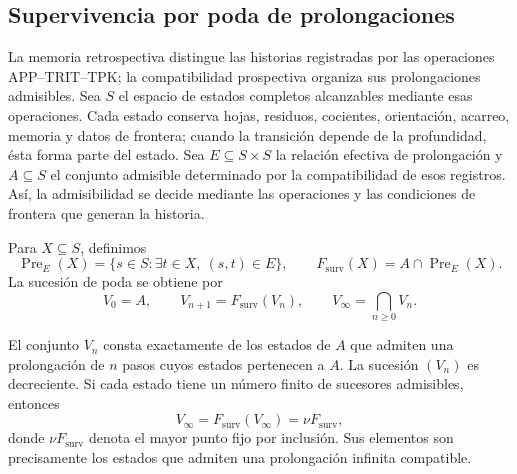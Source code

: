 \subsection{Supervivencia por poda de prolongaciones}
\label{hmtfg:base:corpus9:xi:supervivencia}

La memoria retrospectiva distingue las historias registradas por las
operaciones APP--TRIT--TPK; la compatibilidad prospectiva organiza sus
prolongaciones admisibles. Sea \(S\) el espacio de estados completos
alcanzables mediante esas operaciones. Cada estado conserva hojas, residuos,
cocientes, orientación, acarreo, memoria y datos de frontera; cuando la
transición depende de la profundidad, ésta forma parte del estado.
Sea \(E\subseteq S\times S\) la relación efectiva de prolongación y
\(A\subseteq S\) el conjunto admisible determinado por la compatibilidad de
esos registros. Así, la admisibilidad se decide mediante las operaciones y
las condiciones de frontera que generan la historia.

Para \(X\subseteq S\), definimos
\begin{equation}
 \operatorname{Pre}_{E}(X)
 =\{s\in S:\exists t\in X,\ (s,t)\in E\},
 \qquad
 F_{\mathrm{surv}}(X)=A\cap\operatorname{Pre}_{E}(X).
 \label{hmtfg:base:corpus9:xi:operador-poda}
\end{equation}
La sucesión de poda se obtiene por
\begin{equation}
 V_0=A,\qquad
 V_{n+1}=F_{\mathrm{surv}}(V_n),\qquad
 V_\infty=\bigcap_{n\geq0}V_n.
 \label{hmtfg:base:corpus9:xi:sucesion-poda}
\end{equation}

\begin{proposition}
\label{hmtfg:base:corpus9:xi:mayor-punto-fijo}
El conjunto \(V_n\) consta exactamente de los estados de \(A\) que admiten
una prolongación de \(n\) pasos cuyos estados pertenecen a \(A\). La
sucesión \((V_n)\) es decreciente. Si cada estado tiene un número finito
de sucesores admisibles, entonces
\[
 V_\infty=F_{\mathrm{surv}}(V_\infty)
          =\nu F_{\mathrm{surv}},
\]
donde \(\nu F_{\mathrm{surv}}\) denota el mayor punto fijo por inclusión.
Sus elementos son precisamente los estados que admiten una prolongación
infinita compatible.
\end{proposition}

